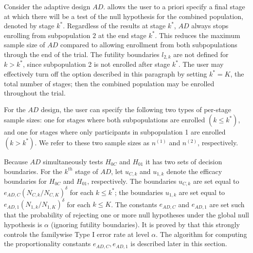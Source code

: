 \documentclass[article]{jss}
\begin{document}
Consider the adaptive design $AD$.
 allows the user to a priori specify a final stage  at which there will be a test of  the null hypothesis for the combined population, denoted by stage $k^*$. Regardless of the results at stage $k^*$, $AD$ always stops enrolling from subpopulation $2$ at the end stage $k^*$. This reduces the maximum sample size of $AD$ compared to allowing enrollment from both subpopulations through the end of the trial.
The futility boundaries $l_{2,k}$ are not defined for $k>k^*$, since subpopulation 2 is not enrolled after stage $k^*$. 
The user may effectively turn off the option described in this paragraph by setting $k^*=K$, the total number of stages; then the combined population may be enrolled throughout the trial.

For the $AD$ design, the user can specify the following two types of per-stage sample sizes: one for stages where both subpopulations are enrolled $(k \leq k^*)$, and one for stages where only participants in subpopulation 1 are enrolled $(k > k^*)$. We refer to these two sample sizes as $n^{(1)}$ and $n^{(2)}$, respectively.

Because $AD$ simultaneously tests $H_{0C}$ and $H_{01}$ it has two sets of decision boundaries. For the $k^{th}$ stage of $AD$, let $u_{C,k}$ and $u_{1,k}$ denote the efficacy boundaries for $H_{0C}$ and $H_{01}$, respectively. The boundaries $u_{C,k}$ 
 are set equal to $e_{AD,C}(N_{C,k}/N_{C,K})^{\delta}$ for each $k\leq k^*$; 
the boundaries $u_{1,k}$ are set equal to  $e_{AD,1}(N_{1,k}/N_{1,K})^{\delta}$ for each $k \leq K$. 
The constants $e_{AD,C}$  and $e_{AD,1}$ are set such that the probability of rejecting one or more null hypotheses under the global null hypothesis is $\alpha$ (ignoring futility boundaries). It is proved by \cite{Rosenblum2013AdaptMISTIE} that this strongly controls the familywise Type I error rate at level $\alpha$. The algorithm for computing the proportionality constants $e_{AD,C}, e_{AD,1}$ is described later in this section.

\end{document}
